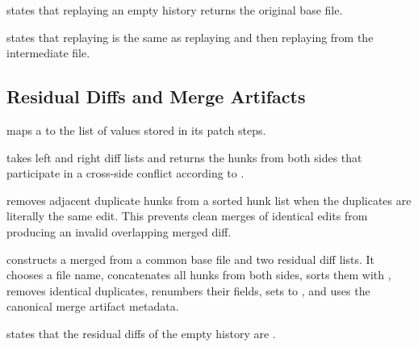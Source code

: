 \begin{theorem}
 states that replaying an empty history returns
the original base file.
\end{theorem}

\begin{theorem}
 states that replaying  is the
same as replaying  and then replaying  from the intermediate
file.
\end{theorem}

\subsection{Residual Diffs and Merge Artifacts}

\begin{definition}[residualDiffs]
\code{[residualDiffs]} maps a  to the list of 
values stored in its patch steps.
\end{definition}

\begin{definition}[conflictWitnesses]
\code{[conflictWitnesses]} takes left and right diff lists and returns the
hunks from both sides that participate in a cross-side conflict according to
.
\end{definition}

\begin{definition}[dedupeIdenticalSortedHunks]
\code{[dedupeIdenticalSortedHunks]} removes adjacent duplicate hunks from a
sorted hunk list when the duplicates are literally the same edit. This prevents
clean merges of identical edits from producing an invalid overlapping merged
diff.
\end{definition}

\begin{definition}[mergedDiffFrom]
\code{[mergedDiffFrom]} constructs a merged  from a common base file
and two residual diff lists. It chooses a file name, concatenates all hunks from
both sides, sorts them with , removes identical
duplicates, renumbers their  fields, sets
 to , and uses the canonical merge
artifact metadata.
\end{definition}

\begin{theorem}
 states that the residual diffs of the empty history
are \code{[]}.
\end{theorem}

